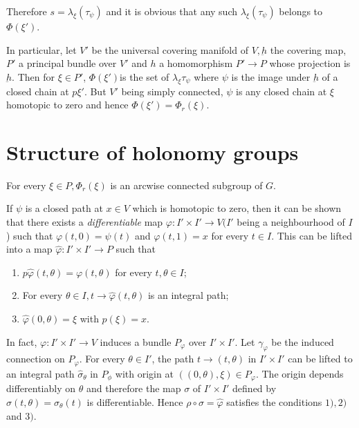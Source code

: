 Therefore $s = \lambda_{\xi}(\tau_{\psi})$ and it is obvious that any
such $\lambda_{\xi}(\tau_{\psi})$ belongs to $\Phi (\xi')$. 

In particular, let $V'$ be the universal covering manifold of $V,
\underbar{h}$ the covering map, $P'$ a principal bundle over $V'$ and
$h$ a homomorphism $P' \to P$ whose projection is $\underbar{h}$. Then
for $\xi \in P'$, $\Phi(\xi')$\pageoriginale is the set of $\lambda_{\xi}
\tau_{\psi}$ where $\psi$ is the image under $\underbar{h}$ of a
closed chain at $p \xi'$. But $V'$ being simply connected, $\psi$ is
any closed chain at $\xi$ homotopic to zero and hence $\Phi (\xi') =
\Phi_r (\xi)$. 

\section{Structure of holonomy groups}\label{chap4:sec6}%

\begin{theorem}\label{chap4:sec6:thm3}%
\end{theorem}
For every $\xi \in P, \Phi_r (\xi)$ is an arcwise connected subgroup of $G$.

If $\psi$ is a closed path at $x \in V$ which is homotopic to zero,
then it can be shown that there exists a \textit{ differentiable} map
$\varphi : I' \times I' \to V(I'$ being a neighbourhood of $I$) such
that $\varphi (t, 0) = \psi (t)$ and $\varphi(t, 1) =x$ for every $t
\in I$. This can be lifted into a map $\hat{\varphi}: I' \times I' \to P$
such that  
\begin{enumerate}[1)]
\item $p \hat{\varphi} (t , \theta ) = \varphi (t, \theta)$ for every
  $t, \theta \in I$; 
\item For every $\theta \in I, t \to \hat{\varphi} (t , \theta )$ is
  an integral path; 
\item $\hat{\varphi} (0 , \theta ) = \xi$ with $p (\xi ) =x$.
\end{enumerate}

In fact, $\varphi: I' \times I' \to V$ induces a bundle $P_{\varphi}$
over $ I' \times I'$. Let $\gamma_{\varphi}$ be the induced connection
on $P_{\varphi}$. For every $\theta \in I'$, the path $t \to (t,
\theta)$ in $ I' \times I'$ can be lifted to an integral path
$\hat{\sigma}_{\theta}$ in $P_\phi$ with origin at $((0, \theta) , \xi) \in
P_{\varphi}$. The origin depends differentiably on $\theta$ and
therefore the map $\sigma$ of $ I' \times I'$ defined by $\sigma(t,
\theta) = \sigma_{\theta}(t) $ is differentiable. Hence $\rho\circ  \sigma
= \hat{\varphi}$ satisfies the conditions $1),2)$ and $3)$. 

